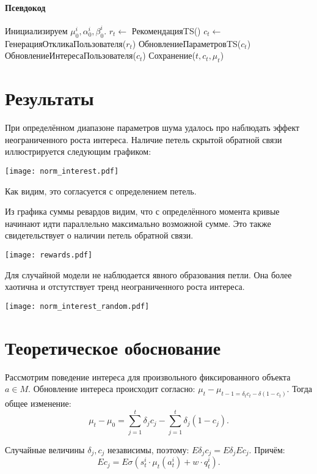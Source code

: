 \documentclass[12pt, twoside]{article}
\begin{document}
\paragraph{Псевдокод}
\begin{algorithmic}
  \STATE Инициализируем $\mu_0^i, \alpha_0^i, \beta_0^i$.
    \STATE $r_t \leftarrow$ РекомендацияTS()
    \STATE $c_t \leftarrow$ ГенерацияОткликаПользователя($r_t$)
    \STATE ОбновлениеПараметровTS($c_t$)
    \STATE ОбновлениеИнтересаПользователя($c_t$)
    \STATE Сохранение($t, c_t, \mu_t$)
  \ENDFOR
\end{algorithmic}

\section{Результаты}
При определённом диапазоне параметров шума удалось про наблюдать эффект неограниченного роста интереса. 
Наличие петель скрытой обратной связи иллюстрируется следующим графиком: 
\begin{center}
  \texttt{[image: norm\_interest.pdf]}
\end{center}
Как видим, это согласуется с определением петель. 

Из графика суммы ревардов видим, что с определённого момента кривые начинают идти параллельно максимально возможной сумме. 
Это также свидетельствует о наличии петель обратной связи. 
\begin{center}
  \texttt{[image: rewards.pdf]}
\end{center}

Для случайной модели не наблюдается явного образования петли. 
Она более хаотична и отстутствует тренд неограниченного роста интереса.   
\begin{center}
  \texttt{[image: norm\_interest\_random.pdf]}
\end{center}

\section{Теоретическое обоснование}
Рассмотрим поведение интереса для произвольного фиксированного объекта $a \in M$. 
Обновление интереса происходит согласно: $\mu_t - \mu_{t-1 = \delta_t c_t - \delta (1 - c_t)}$.
Тогда общее изменение: 
\[
  \mu_t - \mu_0 = \sum_{j=1}^t \delta_j c_j - \sum_{j=1}^t \delta_j (1 - c_j).
\]

Случайные величины $\delta_j, c_j$ независимы, поэтому: $E \delta_j c_j = E \delta_j E c_j$. 
Причём: 
\[
  E c_j = E \sigma(s_t^i \cdot \mu_t(a_t^i) + w \cdot q_t^i).
\]
\end{document}
